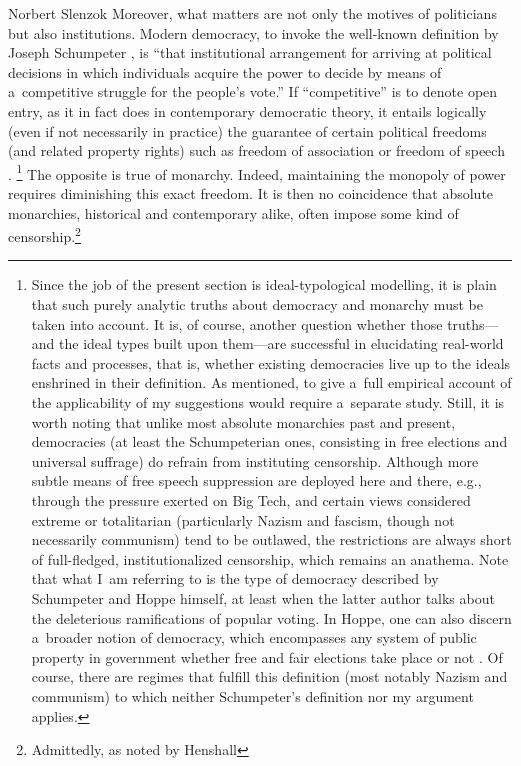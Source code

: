 \begin{artengenv}{Norbert Slenzok}
Moreover, what matters are not only the motives of politicians but also institutions. Modern democracy, to invoke the well-known definition by Joseph Schumpeter 
\parencite*[][p.269]{schumpeter_capitalism_2006}, %
 is ``that institutional arrangement for arriving at political decisions in which individuals acquire the power to decide by means of a~competitive struggle for the people's vote.'' If ``competitive'' is to denote open entry, as it in fact does in contemporary democratic theory, it entails logically (even if not necessarily in practice) the guarantee of certain political freedoms (and related property rights) such as freedom of association or freedom of speech 
\parencites[][]{dahl_democracy_1989}[][pp.13–14]{tilly_democracy_2007}.%
\footnote{Since the job of the present section is ideal-typological modelling, it is plain that such purely analytic truths about democracy and monarchy must be taken into account. It is, of course, another question whether those truths---and the ideal types built upon them---are successful in elucidating real-world facts and processes, that is, whether existing democracies live up to the ideals enshrined in their definition. As mentioned, to give a~full empirical account of the applicability of my suggestions would require a~separate study. Still, it is worth noting that unlike most absolute monarchies past and present, democracies (at least the Schumpeterian ones, consisting in free elections and universal suffrage) do refrain from instituting censorship. Although more subtle means of free speech suppression are deployed here and there, e.g., through the pressure exerted on Big Tech, and certain views considered extreme or totalitarian (particularly Nazism and fascism, though not necessarily communism) tend to be outlawed, the restrictions are always short of full-fledged, institutionalized censorship, which remains an anathema. Note that what I~am referring to is the type of democracy described by Schumpeter and Hoppe himself, at least when the latter author talks about the deleterious ramifications of popular voting. In Hoppe, one can also discern a~broader notion of democracy, which encompasses any system of public property in government whether free and fair elections take place or not 
\parencite[][]{nowakowski_dlaczego_2010}. %
 Of course, there are regimes that fulfill this definition (most notably Nazism and communism) to which neither Schumpeter's definition nor my argument applies. } The opposite is true of monarchy. Indeed, maintaining the monopoly of power requires diminishing this exact freedom. It is then no coincidence that absolute monarchies, historical and contemporary alike, often impose some kind of censorship.\footnote{Admittedly, as noted by Henshall 
}
\end{artengenv}
